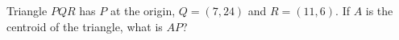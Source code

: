 Triangle $PQR$ has $P$ at the origin, $Q=(7,24)$ and $R=(11,6)$. If $A$ is the centroid of the triangle, what is $AP$?
